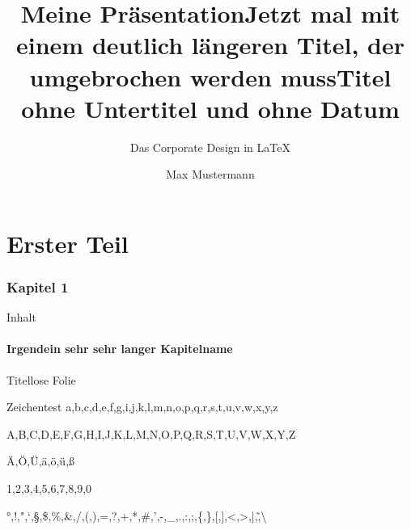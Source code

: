 \documentclass[fleqn,11pt,aspectratio=169]{beamer}
\title{Meine Pr\"asentation}
\subtitle{Das Corporate Design in  \LaTeX}
\author{Max Mustermann}
\begin{document}
\begin{frame}[plain]
\titlepage
\end{frame}

{%
\title{Jetzt mal mit einem deutlich längeren Titel, der umgebrochen werden muss}
\begin{frame}[plain]
\titlepage
\end{frame}}

{\title{Titel ohne Untertitel und ohne Datum}
\subtitle{}
\date{}
\begin{frame}[plain]
\titlepage
\end{frame}}

\part{Erster Teil}

\begin{frame}[plain]
  \partpage
\end{frame}


\section{Kapitel 1}

\begin{frame}{Inhalt}
\tableofcontents
\end{frame}

\subsection{Irgendein sehr sehr langer Kapitelname}

\begin{frame}{}
Titellose Folie
\end{frame}

\begin{frame}{Zeichentest}
a,b,c,d,e,f,g,i,j,k,l,m,n,o,p,q,r,s,t,u,v,w,x,y,z

A,B,C,D,E,F,G,H,I,J,K,L,M,N,O,P,Q,R,S,T,U,V,W,X,Y,Z

Ä,Ö,Ü,ä,ö,ü,ß

1,2,3,4,5,6,7,8,9,0

°,!,",`,§,\$,\%,\&,/,(,),=,?,+,*,\#,',-,\_,.,:,;,\{,\},[,],<,>,|,\~,\textbackslash
\end{frame}
\end{document}
